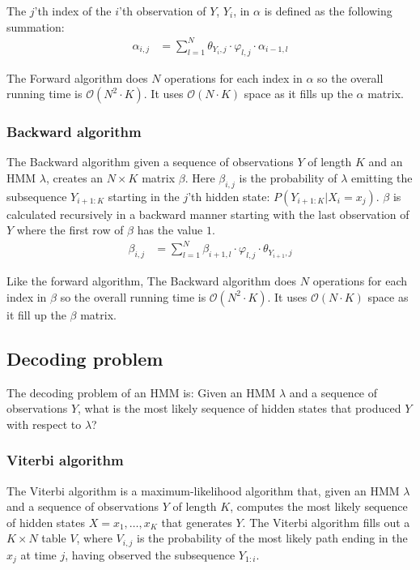 The $j$'th index of the $i$'th observation of $Y$, $Y_i$, in $\alpha$ is defined as the following summation: 
\begin{align*}
    \alpha_{i,j} &= \sum\limits_{l=1}^{N} \theta_{Y_i,j}\cdot\varphi_{l,j}\cdot\alpha_{i-1,l}
\end{align*}

The Forward algorithm does $ N $ operations for each index in $\alpha$ so the overall running time is $\mathcal{O}( N ^2\cdot K)$. It uses $\mathcal{O}( N \cdot K)$ space as it fills up the $\alpha$ matrix.

\subsubsection{Backward algorithm}

The Backward algorithm\cite{Bishop} given a sequence of observations $Y$ of length $K$ and an HMM $\lambda$, creates an $ N \times K$ matrix $\beta$. Here $\beta_{i,j}$ is the probability of $\lambda$ emitting the subsequence $Y_{i+1:K}$ starting in the $j$'th hidden state: $P(Y_{i+1:K}|X_i = x_j)$. 
$\beta$ is calculated recursively in a backward manner starting with the last observation of $Y$ where the first row of $\beta$ has the value $1$.
\begin{align*}
    \beta_{i,j} &= \sum\limits_{l=1}^{N} \beta_{i+1,l}\cdot\varphi_{l,j}\cdot\theta_{Y_{i+1},j}
\end{align*}

Like the forward algorithm, The Backward algorithm does $ N $ operations for each index in $\beta$ so the overall running time is $\mathcal{O}( N ^2\cdot K)$. It uses $\mathcal{O}( N \cdot K)$ space as it fill up the $\beta$ matrix.

\subsection{Decoding problem}

The decoding problem of an HMM is: Given an HMM $\lambda$ and a sequence of observations $Y$, what is the most likely sequence of hidden states that produced $Y$ with respect to $\lambda$? 

\subsubsection{Viterbi algorithm}

The Viterbi algorithm\cite{Bishop} is a maximum-likelihood algorithm that, given an HMM $\lambda$ and a sequence of observations $Y$ of length $K$, computes the most likely sequence of hidden states $X = x_1,\ldots,x_K$ that generates $Y$. 
The Viterbi algorithm fills out a $K \times N$ table $V$, where $V_{i,j}$ is the probability of the most likely path ending in the $x_j$ at time $j$, having observed the subsequence $Y_{1:i}$.

